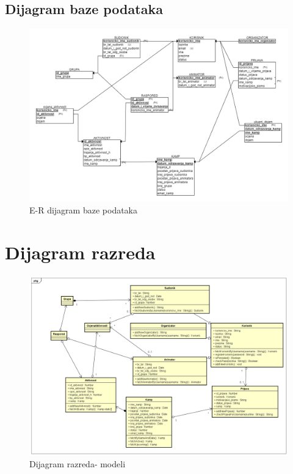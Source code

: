 			\eject
			
			
			\subsection{Dijagram baze podataka}
				\begin{figure}[H]
				\centerline{\includegraphics[width=\linewidth]{slike/ER_model_baze.png}}
				\caption{E-R dijagram baze podataka}
				\label{fig:ERdijagram}
			\end{figure}
			
			\eject
			
			
		\section{Dijagram razreda}
			
			\begin{figure}[H]
				\centerline{\includegraphics[width=\linewidth]{slike/Dijagram_razreda_modeli.png}}
				\caption{Dijagram razreda- modeli}
				\label{fig:dijagram_razreda_modeli}
			\end{figure}
			
